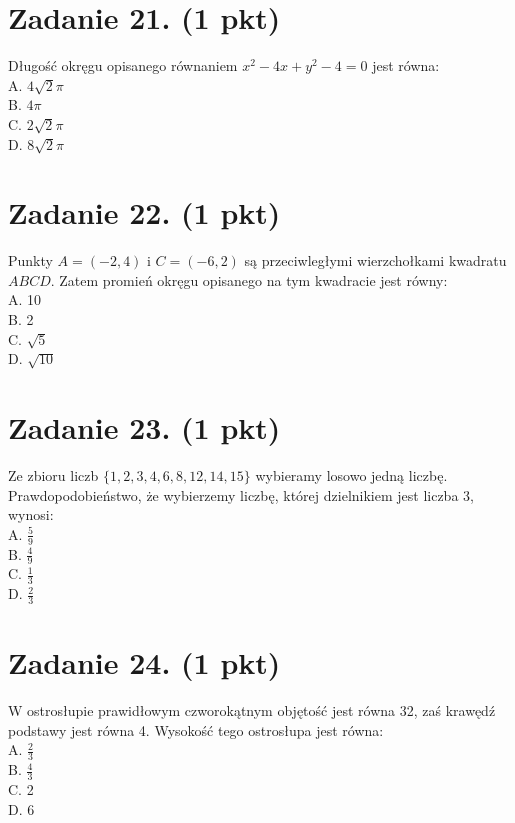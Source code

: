 \documentclass[10pt]{article}
\begin{document}
\section*{Zadanie 21. (1 pkt)}
Długość okręgu opisanego równaniem \(x^{2}-4 x+y^{2}-4=0\) jest równa:\\
A. \(4 \sqrt{2} \pi\)\\
B. \(4 \pi\)\\
C. \(2 \sqrt{2} \pi\)\\
D. \(8 \sqrt{2} \pi\)

\section*{Zadanie 22. (1 pkt)}
Punkty \(A=(-2,4)\) i \(C=(-6,2)\) są przeciwległymi wierzchołkami kwadratu \(A B C D\). Zatem promień okręgu opisanego na tym kwadracie jest równy:\\
A. 10\\
B. 2\\
C. \(\sqrt{5}\)\\
D. \(\sqrt{10}\)

\section*{Zadanie 23. (1 pkt)}
Ze zbioru liczb \(\{1,2,3,4,6,8,12,14,15\}\) wybieramy losowo jedną liczbę. Prawdopodobieństwo, że wybierzemy liczbę, której dzielnikiem jest liczba 3, wynosi:\\
A. \(\frac{5}{9}\)\\
B. \(\frac{4}{9}\)\\
C. \(\frac{1}{3}\)\\
D. \(\frac{2}{3}\)

\section*{Zadanie 24. (1 pkt)}
W ostrosłupie prawidłowym czworokątnym objętość jest równa 32, zaś krawędź podstawy jest równa 4. Wysokość tego ostrosłupa jest równa:\\
A. \(\frac{2}{3}\)\\
B. \(\frac{4}{3}\)\\
C. 2\\
D. 6
\end{document}

